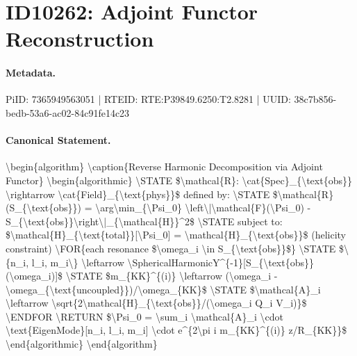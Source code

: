 \section*{ID10262: Adjoint Functor Reconstruction}
\paragraph{Metadata.}
PiID: 7365949563051 | RTEID: RTE:P39849.6250:T2.8281 | UUID: 38c7b856-bedb-53a6-ac02-84c91fe14c23

\paragraph{Canonical Statement.}
\textbackslash{}begin\{algorithm\} \textbackslash{}caption\{Reverse Harmonic Decomposition via Adjoint Functor\} \textbackslash{}begin\{algorithmic\} \textbackslash{}STATE \$\textbackslash{}mathcal\{R\}: \textbackslash{}cat\{Spec\}\_\{\textbackslash{}text\{obs\}\} \textbackslash{}rightarrow \textbackslash{}cat\{Field\}\_\{\textbackslash{}text\{phys\}\}\$ defined by: \textbackslash{}STATE \$\textbackslash{}mathcal\{R\}(S\_\{\textbackslash{}text\{obs\}\}) = \textbackslash{}arg\textbackslash{}min\_\{\textbackslash{}Psi\_0\} \textbackslash{}left\textbackslash{}|\textbackslash{}mathcal\{F\}(\textbackslash{}Psi\_0) - S\_\{\textbackslash{}text\{obs\}\}\textbackslash{}right\textbackslash{}|\_\{\textbackslash{}mathcal\{H\}\}\textasciicircum{}2\$ \textbackslash{}STATE subject to: \$\textbackslash{}mathcal\{H\}\_\{\textbackslash{}text\{total\}\}[\textbackslash{}Psi\_0] = \textbackslash{}mathcal\{H\}\_\{\textbackslash{}text\{obs\}\}\$ (helicity constraint) \textbackslash{}FOR\{each resonance \$\textbackslash{}omega\_i \textbackslash{}in S\_\{\textbackslash{}text\{obs\}\}\$\} \textbackslash{}STATE \$\textbackslash{}\{n\_i, l\_i, m\_i\textbackslash{}\} \textbackslash{}leftarrow \textbackslash{}SphericalHarmonicY\textasciicircum{}\{-1\}[S\_\{\textbackslash{}text\{obs\}\}(\textbackslash{}omega\_i)]\$ \textbackslash{}STATE \$m\_\{KK\}\textasciicircum{}\{(i)\} \textbackslash{}leftarrow (\textbackslash{}omega\_i - \textbackslash{}omega\_\{\textbackslash{}text\{uncoupled\}\})/\textbackslash{}omega\_\{KK\}\$ \textbackslash{}STATE \$\textbackslash{}mathcal\{A\}\_i \textbackslash{}leftarrow \textbackslash{}sqrt\{2\textbackslash{}mathcal\{H\}\_\{\textbackslash{}text\{obs\}\}/(\textbackslash{}omega\_i Q\_i V\_i)\}\$ \textbackslash{}ENDFOR \textbackslash{}RETURN \$\textbackslash{}Psi\_0 = \textbackslash{}sum\_i \textbackslash{}mathcal\{A\}\_i \textbackslash{}cdot \textbackslash{}text\{EigenMode\}[n\_i, l\_i, m\_i] \textbackslash{}cdot e\textasciicircum{}\{2\textbackslash{}pi i m\_\{KK\}\textasciicircum{}\{(i)\} z/R\_\{KK\}\}\$ \textbackslash{}end\{algorithmic\} \textbackslash{}end\{algorithm\}

